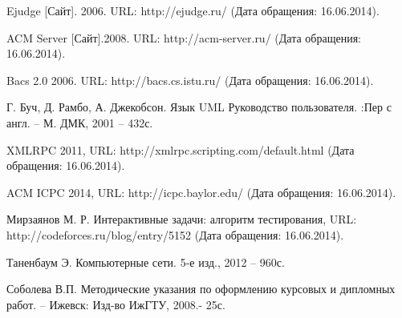 \begin{thebibliography}{9}

Ejudge [Сайт]. 2006. URL: http://ejudge.ru/ (Дата обращения: 16.06.2014).

ACM Server [Сайт].2008. URL: http://acm-server.ru/ (Дата обращения: 16.06.2014).

Bacs 2.0 2006. URL: http://bacs.cs.istu.ru/ (Дата обращения: 16.06.2014).

Г. Буч, Д. Рамбо, А. Джекобсон. Язык UML Руководство пользователя. :Пер с англ. – М. ДМК, 2001 – 432с.

XMLRPC 2011, URL: http://xmlrpc.scripting.com/default.html (Дата обращения: 16.06.2014).

ACM ICPC 2014, URL: http://icpc.baylor.edu/ (Дата обращения: 16.06.2014).

Мирзаянов М. Р. Интерактивные задачи: алгоритм тестирования, URL: http://codeforces.ru/blog/entry/5152 (Дата обращения: 16.06.2014).

Таненбаум Э. Компьютерные сети. 5-е изд., 2012 -- 960с.

Соболева В.П. Методические указания по оформлению курсовых и дипломных работ. – Ижевск: Изд-во ИжГТУ, 2008.- 25с.

\end{thebibliography}
